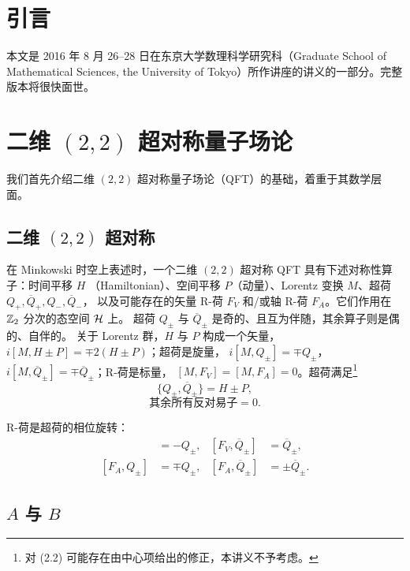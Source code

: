 
\section{引言}
\label{sec:intro}

本文是 2016 年 8 月 26--28 日在东京大学数理科学研究科（Graduate School of Mathematical Sciences,
the University of Tokyo）所作讲座的讲义的一部分。完整版本将很快面世。

\section{二维 $(2,2)$ 超对称量子场论}
\label{sec:2d}

我们首先介绍二维 $(2,2)$ 超对称量子场论（QFT）的基础，着重于其数学层面。

\subsection{二维 $(2,2)$ 超对称}
\label{sec:22susy}

在 Minkowski 时空上表述时，一个二维 $(2,2)$ 超对称 QFT 具有下述对称性算子：时间平移 $H$
（Hamiltonian）、空间平移 $P$（动量）、Lorentz 变换 $M$、超荷 $Q_+,\overline Q_+,Q_-,\overline Q_-$，
以及可能存在的矢量 R-荷 $F_V$ 和/或轴 R-荷 $F_A$。它们作用在 $\mathbb{Z}_2$ 分次的态空间 $\mathcal{H}$ 上。
超荷 $Q_\pm$ 与 $\overline Q_\pm$ 是奇的、且互为伴随，其余算子则是偶的、自伴的。
关于 Lorentz 群，$H$ 与 $P$ 构成一个矢量，$i[M,H\pm P]=\mp 2(H\pm P)$；超荷是旋量，
$i[M,Q_\pm]=\mp Q_\pm$，$i[M,\overline Q_\pm]=\mp\overline Q_\pm$；R-荷是标量，
$[M,F_V]=[M,F_A]=0$。超荷满足\footnote{对 (2.2) 可能存在由中心项给出的修正，本讲义不予考虑。}
\begin{equation}
  \{Q_\pm,\overline Q_\pm\}=H\pm P, \tag{2.1}
\end{equation}
\begin{equation}
  \text{其余所有反对易子}=0. \tag{2.2}
\end{equation}

R-荷是超荷的相位旋转：
\begin{align}
  [F_V,Q_\pm]&=-Q_\pm, & [F_V,\overline Q_\pm]&=\overline Q_\pm, \tag{2.3}\\
  [F_A,Q_\pm]&=\mp Q_\pm, & [F_A,\overline Q_\pm]&=\pm\overline Q_\pm. \tag{2.4}
\end{align}

\subsection{$A$ 与 $B$}
\label{sec:AandB}

